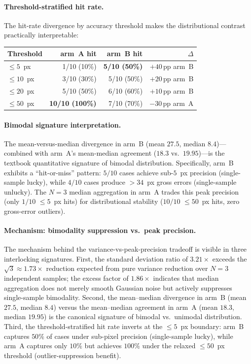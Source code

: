 \paragraph{Threshold-stratified hit rate.}
The hit-rate divergence by accuracy threshold makes the
distributional contrast practically interpretable:

\begin{center}
\small
\begin{tabular}{@{}lrrr@{}}
\toprule
\textbf{Threshold} & \textbf{arm~A hit} & \textbf{arm~B hit} & \textbf{$\Delta$} \\
\midrule
$\leq 5$~px  & 1/10 (10\%)  & \textbf{5/10 (50\%)} & $+40$\,pp arm~B \\
$\leq 10$~px & 3/10 (30\%)  & 5/10 (50\%)          & $+20$\,pp arm~B \\
$\leq 20$~px & 5/10 (50\%)  & 6/10 (60\%)          & $+10$\,pp arm~B \\
$\leq 50$~px & \textbf{10/10 (100\%)} & 7/10 (70\%) & $-30$\,pp arm~A \\
\bottomrule
\end{tabular}
\end{center}

\paragraph{Bimodal signature interpretation.}
The mean-versus-median divergence in arm~B (mean $27.5$,
median $8.4$)---combined with arm~A's mean-median agreement
($18.3$ vs.\ $19.95$)---is the textbook quantitative
signature of bimodal distribution.  Specifically, arm~B
exhibits a ``hit-or-miss'' pattern: $5/10$ cases achieve
sub-$5$~px precision (single-sample lucky), while $4/10$
cases produce $>34$~px gross errors (single-sample unlucky).
The $N=3$ median aggregation in arm~A trades this peak
precision (only $1/10$ $\leq 5$~px hits) for distributional
stability ($10/10$ $\leq 50$~px hits, zero gross-error
outliers).

\paragraph{Mechanism: bimodality suppression vs.\ peak precision.}
The mechanism behind the variance-vs-peak-precision tradeoff
is visible in three interlocking signatures.  First, the
standard deviation ratio of $3.21\times$ exceeds the
$\sqrt{3}\approx 1.73\times$ reduction expected from pure
variance reduction over $N=3$ independent samples; the excess
factor of $1.86\times$ indicates that median aggregation does
not merely smooth Gaussian noise but actively suppresses
single-sample bimodality.  Second, the mean--median
divergence in arm~B (mean $27.5$, median $8.4$) versus the
mean--median agreement in arm~A (mean $18.3$, median
$19.95$) is the canonical signature of bimodal vs.\ unimodal
distribution.  Third, the threshold-stratified hit rate
inverts at the $\leq\!5$~px boundary: arm~B captures $50\%$
of cases under sub-pixel precision (single-sample lucky),
while arm~A captures only $10\%$ but achieves $100\%$ under
the relaxed $\leq\!50$~px threshold (outlier-suppression
benefit).

